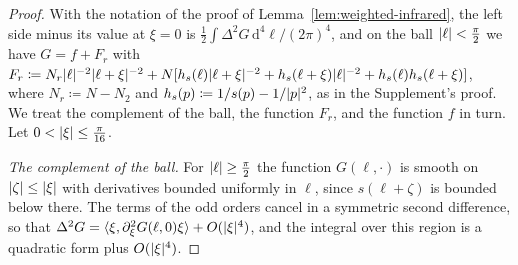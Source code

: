 \documentclass[11pt]{preprint}
\newcommand{\dd}{\mathrm{d}}
\DeclarePairedDelimiter{\abs}{\lvert}{\rvert}
\numberwithin{equation}{section}
\theoremstyle{definition}
\theoremstyle{remark}
\theoremstyle{plain}
\begin{document}
\begin{proof}
With the notation of the proof of Lemma~\ref{lem:weighted-infrared}, the left side minus its value at $\xi = 0$ is $\frac12\int\Delta^2G\,\dd^4\ell/(2\pi)^4$, and on the ball $\abs\ell < \frac\pi2$ we have $G = f + F_r$ with $F_r \coloneqq N_r\abs\ell^{-2}\abs{\ell + \xi}^{-2} + N[h_s(\ell)\abs{\ell + \xi}^{-2} + h_s(\ell + \xi)\abs\ell^{-2} + h_s(\ell)h_s(\ell + \xi)]$, where $N_r \coloneqq N - N_2$ and $h_s(p) \coloneqq 1/s(p) - 1/\abs p^2$, as in the Supplement's proof. We treat the complement of the ball, the function $F_r$, and the function $f$ in turn. Let $0 < \abs\xi \leq \frac{\pi}{16}$.

\emph{The complement of the ball.} For $\abs\ell \geq \frac\pi2$ the function $G(\ell, \cdot)$ is smooth on $\abs\zeta \leq \abs\xi$ with derivatives bounded uniformly in $\ell$, since $s(\ell + \zeta)$ is bounded below there. The terms of the odd orders cancel in a symmetric second difference, so that $\Delta^2G = \langle\xi, \partial_\xi^2G(\ell, 0)\xi\rangle + O(\abs\xi^4)$, and the integral over this region is a quadratic form plus $O(\abs\xi^4)$.


\end{proof}
\end{document}
